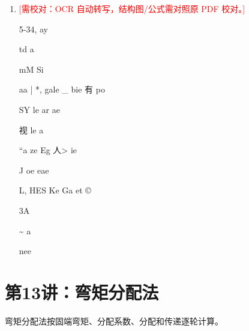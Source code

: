 \documentclass[UTF8,12pt,a4paper,openany]{ctexbook}
\newcommand{\TODO}[1]{\textcolor{red}{[需校对：#1]}}
\begin{document}
\begin{enumerate}[label=\textbf{\arabic*.},leftmargin=2em]
r =\par EI\par ql\par X\par EI\par ql\par X\par EI\par ql\par X\par 7632\par 461\par 159\par 20\par 636\par 49\par 4\par 3\par 4\par 2\par 3\par 1\par \par 【第 28 页，来源：ocr】\par EEA RS TID)\par 未久极信1981387888
\item \TODO{OCR 自动转写，结构图/公式需对照原 PDF 校对。}\par 5-34,    ay\par td        a\par mM   Si\par aa | *, gale \_ bie 有 po\par SY le     ar   ae\par 视 le a\par “a  ze Eg      人> ie\par J                oe eae\par L, HES Ke Ga et ©\par 3A\par \textasciitilde{}   a\par nee
\end{enumerate}
\chapter{第13讲：弯矩分配法}
\begin{tcolorbox}[title=解析总览]
弯矩分配法按固端弯矩、分配系数、分配和传递逐轮计算。
\end{tcolorbox}
\end{document}

